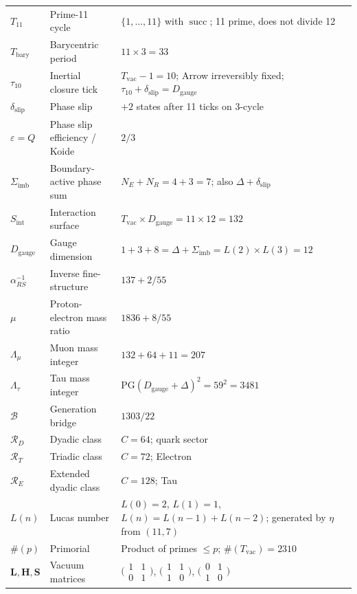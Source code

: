 \documentclass[11pt, letterpaper]{article}
\newcommand{\aop}{\eta}
\renewcommand{\succ}{\operatorname{succ}}
\newcommand{\Tcyc}{T_{11}}
\newcommand{\Tbary}{T_{\mathrm{bary}}}
\newcommand{\Dg}{D_{\mathrm{gauge}}}
\newcommand{\Sint}{S_{\mathrm{int}}}
\newcommand{\Bridge}{\mathcal{B}}
\newcommand{\Sigimb}{\Sigma_{\mathrm{imb}}}
\newcommand{\PG}{\mathrm{PG}}
\theoremstyle{definition}
\theoremstyle{plain}
\begin{document}
\begin{longtable}{L{2.2cm} L{5.5cm} L{5.5cm}}
$\Tcyc$ & Prime-11 cycle & $\{1,\dots,11\}$ with $\succ$; 11 prime, does not divide 12 \\
$\Tbary$ & Barycentric period & $11\times 3=33$ \\
$\tau_{10}$ & Inertial closure tick &
  $T_{\mathrm{vac}}-1=10$; Arrow irreversibly fixed; $\tau_{10}+\delta_{\mathrm{slip}}=\Dg$ \\
$\delta_{\mathrm{slip}}$ & Phase slip & $+2$ states after 11 ticks on 3-cycle \\
$\varepsilon=Q$ & Phase slip efficiency / Koide & $2/3$ \\
$\Sigimb$ & Boundary-active phase sum & $N_E+N_R=4+3=7$; also $\Delta+\delta_{\mathrm{slip}}$ \\
$\Sint$ & Interaction surface & $T_{\mathrm{vac}}\times\Dg=11\times 12=132$ \\
$\Dg$ & Gauge dimension &
  $1+3+8=\Delta+\Sigimb=L(2)\times L(3)=12$ \\
$\alpha^{-1}_{RS}$ & Inverse fine-structure & $137+2/55$ \\
$\mu$ & Proton-electron mass ratio & $1836+8/55$ \\
$\Lambda_\mu$ & Muon mass integer & $132+64+11=207$ \\
$\Lambda_\tau$ & Tau mass integer & $\PG(\Dg+\Delta)^2=59^2=3481$ \\
$\Bridge$ & Generation bridge & $1303/22$ \\
$\mathcal{R}_D$ & Dyadic class & $C=64$; quark sector \\
$\mathcal{R}_T$ & Triadic class & $C=72$; Electron \\
$\mathcal{R}_E$ & Extended dyadic class & $C=128$; Tau \\
$L(n)$ & Lucas number &
  $L(0)=2$, $L(1)=1$, $L(n)=L(n-1)+L(n-2)$; generated by $\aop$ from $(11,7)$ \\
$\#(p)$ & Primorial &
  Product of primes $\leq p$; $\#(T_{\mathrm{vac}})=2310$ \\
$\mathbf{L},\mathbf{H},\mathbf{S}$ & Vacuum matrices &
  $\bigl(\begin{smallmatrix}1&1\\0&1\end{smallmatrix}\bigr)$,
  $\bigl(\begin{smallmatrix}1&1\\1&0\end{smallmatrix}\bigr)$,
  $\bigl(\begin{smallmatrix}0&1\\1&0\end{smallmatrix}\bigr)$ \\

\end{longtable}
\end{document}
